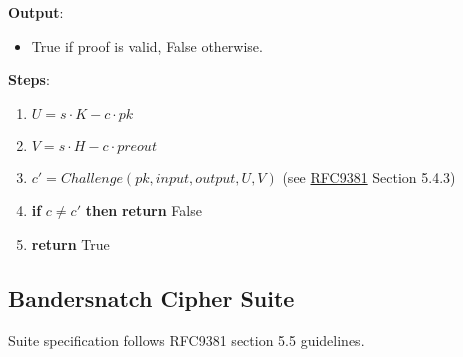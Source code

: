 \documentclass[
]{article}
\providecommand{\tightlist}{%
  \setlength{\itemsep}{0pt}\setlength{\parskip}{0pt}}
\begin{document}
\textbf{Output}:

\begin{itemize}
\tightlist
\item
  True if proof is valid, False otherwise.
\end{itemize}

\textbf{Steps}:

\begin{enumerate}
\def\labelenumi{\arabic{enumi}.}
\tightlist
\item
  \(U = s \cdot K - c \cdot pk\)
\item
  \(V = s \cdot H - c \cdot preout\)
\item
  \(c' = Challenge(pk, input, output, U, V)\) (see
  \href{https://datatracker.ietf.org/doc/rfc9381/}{RFC9381} Section
  5.4.3)
\item
  \textbf{if} \(c \neq c'\) \textbf{then} \textbf{return} False
\item
  \textbf{return} True
\end{enumerate}

\hypertarget{bandersnatch-cipher-suite}{%
\subsection{Bandersnatch Cipher Suite}\label{bandersnatch-cipher-suite}}

Suite specification follows RFC9381 section 5.5 guidelines.
\end{document}
